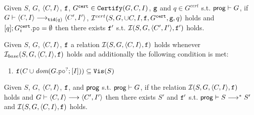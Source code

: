 \documentclass[12pt]{article}
\begin{document}
\begin{lemma}
  Given $S$, $G$, $\langle C, I \rangle$, ${\mathtt{f}}$, 
  $G^{{\mathtt{cert}}} \in {\mathtt{Certify}}(G, C, I)$, ${\mathtt{g}}$ and $q \in G^{cert}$
  s.t. $\mathsf{prog} \vdash G$, if $G \vdash \langle C, I \rangle \longrightarrow_{{\mathtt{tid}}(q)} \langle C', I' \rangle$, 
  $\mathcal{I}^{cert}(S, G, \cup{C, I}, {\mathtt{f}}, G^{{\mathtt{cert}}}, {\mathtt{g}}, q)$ holds 
  and $[q];G_{i}^{\cert}.\lPO = \emptyset$ then there exists
  ${\mathtt{f}}'$ s.t. $\mathcal{I}(S, G, \langle C', I' \rangle, {\mathtt{f}}')$ holds.
\end{lemma}

\begin{definition}
  \label{def:sim-rel}
  Given $S$, $G$, $\langle C, I \rangle$, ${\mathtt{f}}$ a relation $\mathcal{I}(S, G, \langle C, I \rangle, {\mathtt{f}})$ holds
  whenever $\mathcal{I}_{base}(S, G, \langle C, I \rangle, {\mathtt{f}})$ holds and additionally
  the following condition is met:
  \begin{enumerate}[label=\textbf{S.\arabic*},start=8]
    \item \label{item:sim-vis}
       $\f(C \cup \dom{G.\lPO^?;[I]}) \subseteq \lVIS(S)$
  \end{enumerate}
\end{definition}

\begin{lemma}
  \label{lemma:sim-step}
  Given $S$, $G$, $\langle C, I \rangle$, ${\mathtt{f}}$, and $\mathsf{prog}$ 
  s.t. $\mathsf{prog} \vdash G$,
  if the relation $\mathcal{I}(S, G, \langle C, I \rangle, {\mathtt{f}})$ holds
  and $G \vdash \langle C, I \rangle \longrightarrow \langle C', I' \rangle$
  then there exists $S'$ and ${\mathtt{f}}'$ s.t.
  $\mathsf{prog} \vdash S \longrightarrow^* S'$ and
  $\mathcal{I}(S, G, \langle C, I \rangle, {\mathtt{f}})$ holds.
\end{lemma}

  


\end{document}
